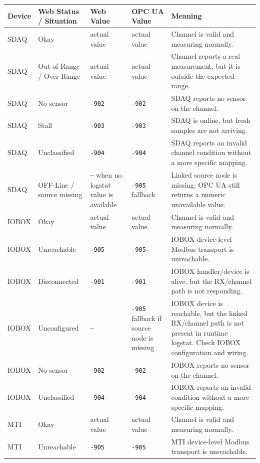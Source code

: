 \documentclass[11pt,a4paper]{article}
\begin{document}
\begingroup
\small
\setlength{\tabcolsep}{2pt}
\begin{longtable}{|p{}|p{}|p{}|p{}|p{}|}
\hline
\textbf{Device} & \textbf{Web Status / Situation} & \textbf{Web Value} & \textbf{OPC UA Value} & \textbf{Meaning} \\
\hline
SDAQ & Okay & actual value & actual value & Channel is valid and measuring normally. \\
\hline
SDAQ & Out of Range / Over Range & actual value & actual value & Channel reports a real measurement, but it is outside the expected range. \\
\hline
SDAQ & No sensor & \texttt{-902} & \texttt{-902} & SDAQ reports no sensor on the channel. \\
\hline
SDAQ & Stall & \texttt{-903} & \texttt{-903} & SDAQ is online, but fresh samples are not arriving. \\
\hline
SDAQ & Unclassified & \texttt{-904} & \texttt{-904} & SDAQ reports an invalid channel condition without a more specific mapping. \\
\hline
SDAQ & OFF-Line / source missing & \texttt{---} when no logstat value is available & \texttt{-905} fallback & Linked source node is missing; OPC UA still returns a numeric unavailable value. \\
\hline
IOBOX & Okay & actual value & actual value & Channel is valid and measuring normally. \\
\hline
IOBOX & Unreachable & \texttt{-905} & \texttt{-905} & IOBOX device-level Modbus transport is unreachable. \\
\hline
IOBOX & Disconnected & \texttt{-901} & \texttt{-901} & IOBOX handler/device is alive, but the RX/channel path is not responding. \\
\hline
IOBOX & Unconfigured & \texttt{---} & \texttt{-905} fallback if source node is missing & IOBOX device is reachable, but the linked RX/channel path is not present in runtime logstat. Check IOBOX configuration and wiring. \\
\hline
IOBOX & No sensor & \texttt{-902} & \texttt{-902} & IOBOX reports no sensor on the channel. \\
\hline
IOBOX & Unclassified & \texttt{-904} & \texttt{-904} & IOBOX reports an invalid condition without a more specific mapping. \\
\hline
MTI & Okay & actual value & actual value & Channel is valid and measuring normally. \\
\hline
MTI & Unreachable & \texttt{-905} & \texttt{-905} & MTI device-level Modbus transport is unreachable. \\

\end{longtable}
\end{document}
